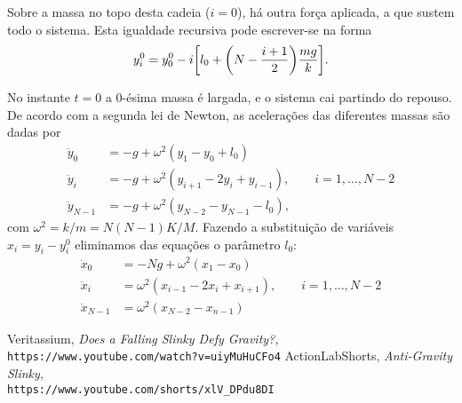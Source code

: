 \documentclass{article}
\begin{document}
\vspace{0.75em}
\noindent
Sobre a massa no topo desta cadeia ($i=0$), há outra força aplicada, a que
sustem todo o sistema. Esta igualdade recursiva pode escrever-se na forma
\begin{equation}
  y^0_i = y^0_0 - i\qty[l_0 + \qty(N-\frac{i+1}{2})\frac{mg}{k}].
\end{equation}

No instante $t=0$ a 0-ésima massa é largada, e o sistema cai partindo do
repouso. De acordo com a segunda lei de Newton, as acelerações das diferentes
massas são dadas por
\begin{equation}
  \begin{aligned}
    \ddot y_0     &= -g + \omega^2 (y_1-y_0+l_0)\\
    \ddot y_i     &= -g + \omega^2 
      (y_{i+1}-2y_i+y_{i-1}),\qquad i=1, \ldots, N-2\\
    \ddot y_{N-1} &= -g + \omega^2 (y_{N-2}-y_{N-1}-l_0),
  \end{aligned}
\end{equation}
com $\omega^2=k/m=N(N-1)K/M$. Fazendo a substituição de variáveis $x_i=y_i -
y_i^0$ eliminamos das equações o parâmetro $l_0$:
\begin{equation}
  \begin{aligned}
    \ddot x_0 &=-Ng+\omega^2(x_1-x_0)\\
    \ddot x_i &= \omega^2(x_{i-1}-2x_i+x_{i+1}),\qquad i=1, \ldots, N-2\\
    \ddot x_{N-1} &=\omega^2(x_{N-2}-x_{n-1})
  \end{aligned}
\end{equation}



\begin{thebibliography}{100}
   Veritassium, 
    \textsl{Does a Falling Slinky Defy Gravity?,}\\
    \texttt{https://www.youtube.com/watch?v=uiyMuHuCFo4}
      ActionLabShorts,
      \textsl{Anti-Gravity Slinky,}\\
      \texttt{https://www.youtube.com/shorts/xlV\_DPdu8DI}
\end{thebibliography}
\end{document}
